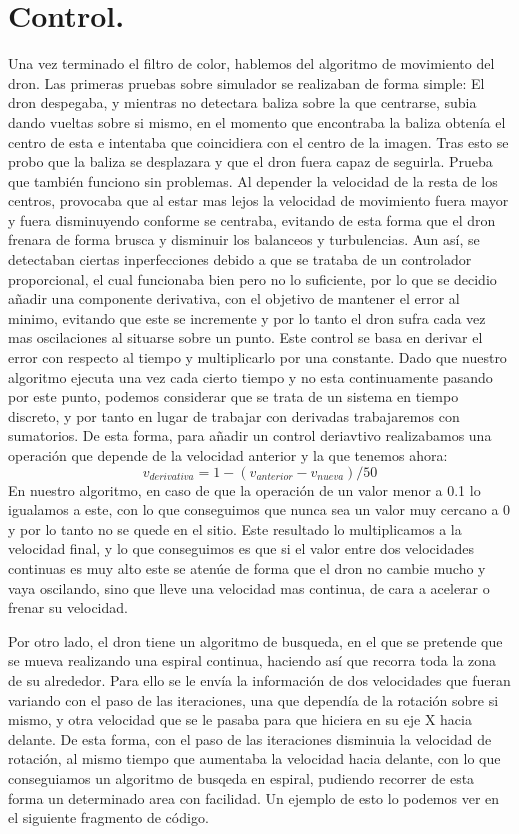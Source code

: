 \section{Control.}
\hspace{1cm} Una vez terminado el filtro de color, hablemos del algoritmo de movimiento del dron. Las primeras pruebas sobre simulador se realizaban de forma simple: El dron despegaba, y mientras no detectara baliza sobre la que centrarse, subia dando vueltas sobre si mismo, en el momento que encontraba la baliza obten\'ia el centro de esta e intentaba que coincidiera con el centro de la imagen. Tras esto se probo que la baliza se desplazara y que el dron fuera capaz de seguirla. Prueba que tambi\'en funciono sin problemas. Al depender la velocidad de la resta de los centros, provocaba que al estar mas lejos la velocidad de movimiento fuera mayor y fuera disminuyendo conforme se centraba, evitando de esta forma que el dron frenara de forma brusca y disminuir los balanceos y turbulencias. 
Aun as\'i, se detectaban ciertas inperfecciones debido a que se trataba de un controlador proporcional, el cual funcionaba bien pero no lo suficiente, por lo que se decidio añadir una componente derivativa, con el objetivo de mantener el error al minimo, evitando que este se incremente y por lo tanto el dron sufra cada vez mas oscilaciones al situarse sobre un punto. Este control se basa en derivar el error con respecto al tiempo y multiplicarlo por una constante. Dado que nuestro algoritmo ejecuta una vez cada cierto tiempo y no esta continuamente pasando por este punto, podemos considerar que se trata de un sistema en tiempo discreto, y por tanto en lugar de trabajar con derivadas trabajaremos con sumatorios. De esta forma, para añadir un control deriavtivo realizabamos una operaci\'on que depende de la velocidad anterior y la que tenemos ahora: \[v_{derivativa} =1-(v_{anterior}-v_{nueva})/50 \]  
\hspace{1cm} En nuestro algoritmo, en caso de que la operaci\'on de un valor menor a 0.1 lo igualamos a este, con lo que conseguimos que nunca sea un valor muy cercano a 0 y por lo tanto no se quede en el sitio. Este resultado lo multiplicamos a la velocidad final, y lo que conseguimos es que si el valor entre dos velocidades continuas es muy alto este se aten\'ue de forma que el dron no cambie mucho y vaya oscilando, sino que lleve una velocidad mas continua, de cara a acelerar o frenar su velocidad. 

\hspace{1cm} Por otro lado, el dron tiene un algoritmo de busqueda, en el que se pretende que se mueva realizando una espiral continua, haciendo as\'i que recorra toda la zona de su alrededor. Para ello se le env\'ia la informaci\'on de dos velocidades que fueran variando con el paso de las iteraciones, una que depend\'ia de la rotaci\'on sobre si mismo, y otra velocidad que se le pasaba para que hiciera en su eje X hacia delante. De esta forma, con el paso de las iteraciones disminuia la velocidad de rotaci\'on, al mismo tiempo que aumentaba la velocidad hacia delante, con lo que conseguiamos un algoritmo de busqeda en espiral, pudiendo recorrer de esta forma un determinado area con facilidad. Un ejemplo de esto lo podemos ver en el siguiente fragmento de c\'odigo.

